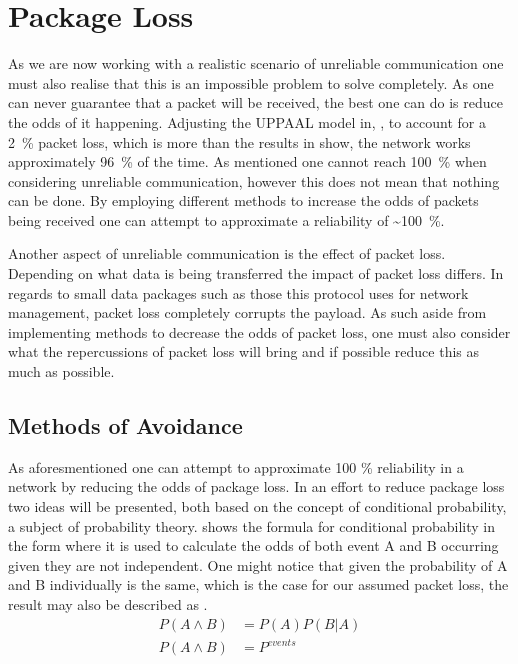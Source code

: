 \section{Package Loss}
As we are now working with a realistic scenario of unreliable communication one must also realise that this is an impossible problem to solve completely.
As one can never guarantee that a packet will be received, the best one can do is reduce the odds of it happening.
Adjusting the UPPAAL model in, , to account for a 2~\% packet loss, which is more than the results in  show, the network works approximately 96~\% of the time.
As mentioned one cannot reach 100~\% when considering unreliable communication, however this does not mean that nothing can be done.
By employing different methods to increase the odds of packets being received one can attempt to approximate a reliability of \textasciitilde100~\%.

Another aspect of unreliable communication is the effect of packet loss.
Depending on what data is being transferred the impact of packet loss differs.
In regards to small data packages such as those this protocol uses for network management, packet loss completely corrupts the payload.
As such aside from implementing methods to decrease the odds of packet loss, one must also consider what the repercussions of packet loss will bring and if possible reduce this as much as possible. 

\subsection{Methods of Avoidance}\label{sub:avoidance}
As aforesmentioned one can attempt to approximate 100 \% reliability in a network by reducing the odds of package loss.
In an effort to reduce package loss two ideas will be presented, both based on the concept of conditional probability, a subject of probability theory.
 shows the formula for conditional probability in the form where it is used to calculate the odds of both event A and B occurring given they are not independent.
One might notice that given the probability of A and B individually is the same, which is the case for our assumed packet loss, the result may also be described as .
\begin{align}
P(A \land B) &= P(A)P(B|A) \label{eq:conditionalProb} \\  
P(A \land B) &= P^{events} \label{eq:conditionalProb2}
\end{align}

